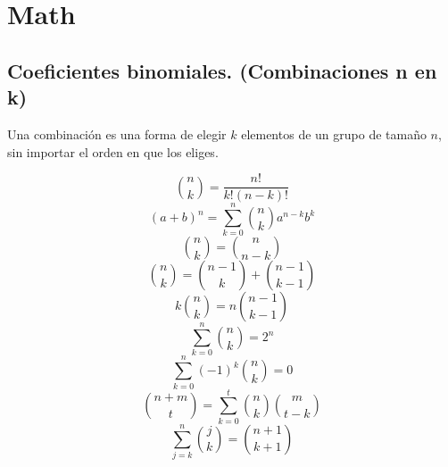 \section{Math}
\subsection{Coeficientes binomiales. (Combinaciones n en k)}
\begin{justify}
Una combinación es una forma de elegir $k$ elementos de un grupo de tamaño $n$, sin importar el orden en que los eliges.
\end{justify}
\begin{equation*}
    \binom{n}{k} = \frac{n!}{k!(n-k)!}
\end{equation*}
\begin{equation*}
    (a+b)^{n} = \sum_{k = 0}^{n} \binom{n}{k}a^{n-k}b^{k}
\end{equation*}
\begin{equation*}
    \binom{n}{k} = \binom{n}{n-k}
\end{equation*}
\begin{equation*}
    \binom{n}{k} = \binom{n-1}{k} + \binom{n-1}{k-1}
\end{equation*}
\begin{equation*}
    k\binom{n}{k} = n\binom{n-1}{k-1}
\end{equation*}
\begin{equation*}
    \sum_{k = 0}^{n}\binom{n}{k} = 2^{n}
\end{equation*}
\begin{equation*}
    \sum_{k = 0}^{n} (-1)^{k}\binom{n}{k} = 0
\end{equation*}
\begin{equation*}
    \binom{n+m}{t} = \sum_{k = 0}^{t}\binom{n}{k}\binom{m}{t-k}
\end{equation*}
\begin{equation*}
    \sum_{j = k}^{n} \binom{j}{k} = \binom{n+1}{k+1}
\end{equation*}

